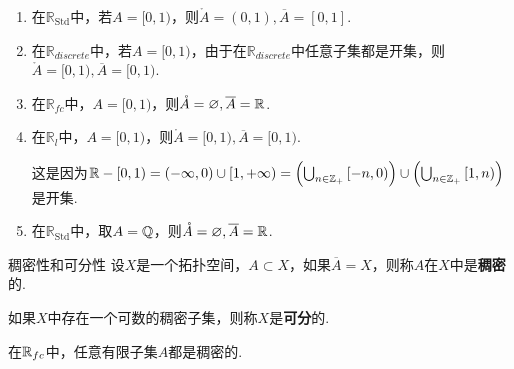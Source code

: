 \begin{instance}
    \begin{enumerate}
        \item 在$\mathbb{R}_\mathrm{Std}$中，若$A=[0,1)$，则$\mathring{A}=(0,1),\overline{A}=[0,1]$.
        \item 在$\mathbb{R}_{discrete}$中，若$A=[0,1)$，由于在$\mathbb{R}_{discrete}$中任意子集都是开集，则$\mathring{A}=[0,1),\overline{A}=[0,1)$.
        \item 在$\mathbb{R}_{fc}$中，$A=[0,1)$，则$\mathring{A}=\varnothing,\overline{A}=\mathbb{R}$.
        \item 在$\mathbb{R}_l$中，$A=[0,1)$，则$\mathring{A}=[0,1),\overline{A}=[0,1)$.\par
        这是因为$\mathbb{R}-[0,1)=(-\infty,0)\cup [1,+\infty)=\left(\bigcup_{n\in\mathbb{Z}_+}{[-n,0)}\right)\cup \left(\bigcup_{n\in\mathbb{Z_+}}{[1,n)}\right)$是开集.
        \item 在$\mathbb{R}_\mathrm{Std}$中，取$A=\mathbb{Q}$，则$\mathring{A}=\varnothing,\overline{A}=\mathbb{R}$.
    \end{enumerate}
\end{instance}


\begin{definition}{稠密性和可分性}
    设$X$是一个拓扑空间，$A\subset X$，如果$\overline{A}=X$，则称$A$在$X$中是\textbf{稠密}的.\par
    如果$X$中存在一个可数的稠密子集，则称$X$是\textbf{可分}的. 
\end{definition}


\begin{instance}
    在$\mathbb{R}_{fc}$中，任意有限子集$A$都是稠密的.
\end{instance}


